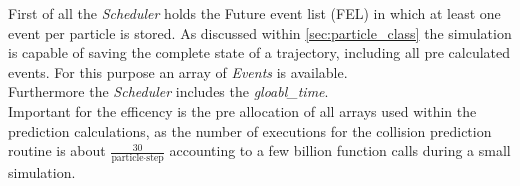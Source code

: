 First of all the \textit{Scheduler} holds the Future event list (FEL) in which at least one event per particle is stored. As discussed within \autoref{sec:particle_class} the simulation is capable of saving the complete state of a trajectory, including all pre calculated events. For this purpose an array of \textit{Events} is available.\\
Furthermore the \textit{Scheduler} includes the \textit{gloabl\_time}.\\
Important for the efficency is the pre allocation of all arrays used within the prediction calculations, as the number of executions for the collision prediction routine is about $\frac{30}{\text{particle} \cdot \text{step}}$ accounting to a few billion function calls during a small simulation.\\

